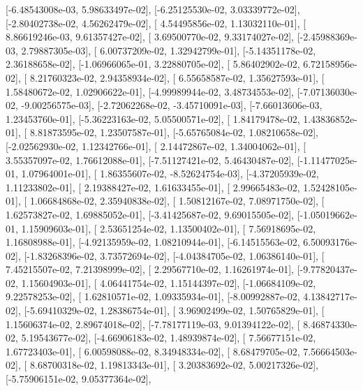 \documentclass{article}
\begin{document}
       [-6.48543008e-03,  5.98633497e-02],
       [-6.25125530e-02,  3.03339772e-02],
       [-2.80402738e-02,  4.56262479e-02],
       [ 4.54495856e-02,  1.13032110e-01],
       [ 8.86619246e-03,  9.61357427e-02],
       [ 3.69500770e-02,  9.33174027e-02],
       [-2.45988369e-03,  2.79887305e-03],
       [ 6.00737209e-02,  1.32942799e-01],
       [-5.14351178e-02,  2.36188658e-02],
       [-1.06966065e-01,  3.22880705e-02],
       [ 5.86402902e-02,  6.72158956e-02],
       [ 8.21760323e-02,  2.94358934e-02],
       [ 6.55658587e-02,  1.35627593e-01],
       [ 1.58480672e-02,  1.02906622e-01],
       [-4.99989944e-02,  3.48734553e-02],
       [-7.07136030e-02, -9.00256575e-03],
       [-2.72062268e-02, -3.45710091e-03],
       [-7.66013606e-03,  1.23453760e-01],
       [-5.36223163e-02,  5.05500571e-02],
       [ 1.84179478e-02,  1.43836852e-01],
       [ 8.81873595e-02,  1.23507587e-01],
       [-5.65765084e-02,  1.08210658e-02],
       [-2.02562930e-02,  1.12342766e-01],
       [ 2.14472867e-02,  1.34004062e-01],
       [ 3.55357097e-02,  1.76612088e-01],
       [-7.51127421e-02,  5.46430487e-02],
       [-1.11477025e-01,  1.07964001e-01],
       [ 1.86355607e-02, -8.52624754e-03],
       [-4.37205939e-02,  1.11233802e-01],
       [ 2.19388427e-02,  1.61633455e-01],
       [ 2.99665483e-02,  1.52428105e-01],
       [ 1.06684868e-02,  2.35940838e-02],
       [ 1.50812167e-02,  7.08971750e-02],
       [ 1.62573827e-02,  1.69885052e-01],
       [-3.41425687e-02,  9.69015505e-02],
       [-1.05019662e-01,  1.15909603e-01],
       [ 2.53651254e-02,  1.13500402e-01],
       [ 7.56918695e-02,  1.16808988e-01],
       [-4.92135959e-02,  1.08210944e-01],
       [-6.14515563e-02,  6.50093176e-02],
       [-1.83268396e-02,  3.73572694e-02],
       [-4.04384705e-02,  1.06386140e-01],
       [ 7.45215507e-02,  7.21398999e-02],
       [ 2.29567710e-02,  1.16261974e-01],
       [-9.77820437e-02,  1.15604903e-01],
       [ 4.06441754e-02,  1.15144397e-02],
       [-1.06684109e-02,  9.22578253e-02],
       [ 1.62810571e-02,  1.09335934e-01],
       [-8.00992887e-02,  4.13842717e-02],
       [-5.69410329e-02,  1.28386754e-01],
       [ 3.96902499e-02,  1.50765829e-01],
       [ 1.15606374e-02,  2.89674018e-02],
       [-7.78177119e-03,  9.01394122e-02],
       [ 8.46874330e-02,  5.19543677e-02],
       [-4.66906183e-02,  1.48939874e-02],
       [ 7.56677151e-02,  1.67723403e-01],
       [ 6.00598088e-02,  8.34948334e-02],
       [ 8.68479705e-02,  7.56664503e-02],
       [ 8.68700318e-02,  1.19813343e-01],
       [ 3.20383692e-02,  5.00217326e-02],
       [-5.75906151e-02,  9.05377364e-02],
\end{document}
